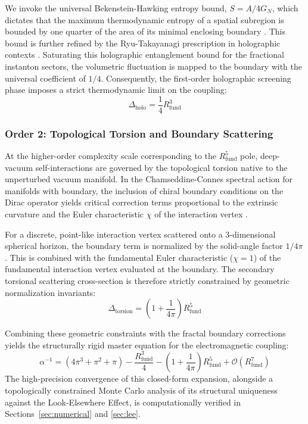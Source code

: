 \documentclass[12pt,a4paper]{article}
\begin{document}
We invoke the universal Bekenstein-Hawking entropy bound, $S = A/4G_N$, which dictates that the maximum thermodynamic entropy of a spatial subregion is bounded by one quarter of the area of its minimal enclosing boundary \cite{Bekenstein1973, Hawking1975}. This bound is further refined by the Ryu-Takayanagi prescription in holographic contexts \cite{Ryu2006}. Saturating this holographic entanglement bound for the fractional instanton sectors, the volumetric fluctuation is mapped to the boundary with the universal coefficient of $1/4$. Consequently, the first-order holographic screening phase imposes a strict thermodynamic limit on the coupling:
\begin{equation}
\Delta_{\text{holo}} = \frac{1}{4} R_{\text{fund}}^3
\end{equation}

\subsubsection{Order 2: Topological Torsion and Boundary Scattering}
At the higher-order complexity scale corresponding to the $R_{\text{fund}}^5$ pole, deep-vacuum self-interactions are governed by the topological torsion native to the unperturbed vacuum manifold. In the Chamseddine-Connes spectral action for manifolds with boundary, the inclusion of chiral boundary conditions on the Dirac operator yields critical correction terms proportional to the extrinsic curvature and the Euler characteristic $\chi$ of the interaction vertex \cite{chamseddine2007, wang2014}.

For a discrete, point-like interaction vertex scattered onto a 3-dimensional spherical horizon, the boundary term is normalized by the solid-angle factor $1/4\pi$. This is combined with the fundamental Euler characteristic ($\chi = 1$) of the fundamental interaction vertex evaluated at the boundary. The secondary torsional scattering cross-section is therefore strictly constrained by geometric normalization invariants:
\begin{equation}
\Delta_{\text{torsion}} = \left(1 + \frac{1}{4\pi}\right) R_{\text{fund}}^5
\end{equation}

Combining these geometric constraints with the fractal boundary corrections yields the structurally rigid master equation for the electromagnetic coupling:
\begin{equation}
\boxed{
\alpha^{-1} = (4\pi^3 + \pi^2 + \pi) - \frac{R_{\text{fund}}^3}{4} - \left(1 + \frac{1}{4\pi}\right)R_{\text{fund}}^5 + \mathcal{O}(R_{\text{fund}}^7)
}
\label{eq:master}
\end{equation}
The high-precision convergence of this closed-form expansion, alongside a topologically constrained Monte Carlo analysis of its structural uniqueness against the Look-Elsewhere Effect, is computationally verified in Sections~\ref{sec:numerical} and \ref{sec:lee}.
\end{document}

